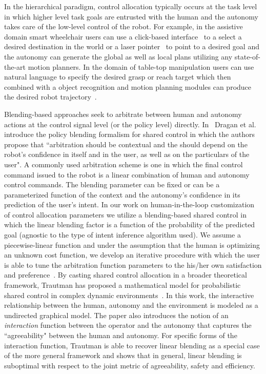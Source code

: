 \documentclass[12pt]{article}
\begin{document}
In the hierarchical paradigm, control allocation typically occurs at the task level in which higher level task goals are entrusted with the human and the autonomy takes care of the low-level control of the robot. For example, in the assistive domain smart wheelchair users can use a click-based interface~\cite{simpson2008tooth} to a select a desired destination in the world or a laser pointer~\cite{choi2008laser} to point to a desired goal and the autonomy can generate the global as well as local plans utilizing any state-of-the-art motion planners. In the domain of table-top manipulation users can use natural language to specify the desired grasp or reach target which then combined with a object recognition and motion planning modules can produce the desired robot trajectory~\cite{broad2016towards}. 

Blending-based approaches seek to arbitrate between human and autonomy actions at the control signal level (or the policy level) directly. In~\cite{dragan2013policy} Dragan et al. introduce the policy blending formalism for shared control in which the authors propose that ``arbitration should be contextual and the should depend on the robot's confidence in itself and in the user, as well as on the particulars of the user". A commonly used arbitration scheme is one in which the final control command issued to the robot is a linear combination of human and autonomy control commands. The blending parameter can be fixed or can be a parameterized function of the context and the autonomy's confidence in its prediction of the user's intent. In our work on human-in-the-loop customization of control allocation parameters we utilize a blending-based shared control in which the linear blending factor is a function of the probability of the predicted goal (agnostic to the type of intent inference algorithm used). We assume a piecewise-linear function and under the assumption that the human is optimizing an unknown cost function, we develop an iterative procedure with which the user is able to tune the arbitration function parameters to the his/her own satisfaction and preference~\cite{gopinath2017human}. By casting shared control allocation in a broader theoretical framework, Trautman has proposed a mathematical model for probabilistic shared control in complex dynamic environments~\cite{trautman2015assistive}. In this work, the interactive relationship between the human, autonomy and the environment is modeled as a undirected graphical model. The paper also introduces the notion of an \textit{interaction} function between the operator and the autonomy that captures the ``agreeability" between the human and autonomy. For specific forms of the interaction function, Trautman is able to recover linear blending as a special case of the more general framework and shows that in general, linear blending is suboptimal with respect to the joint metric of agreeability, safety and efficiency. 
\end{document}
